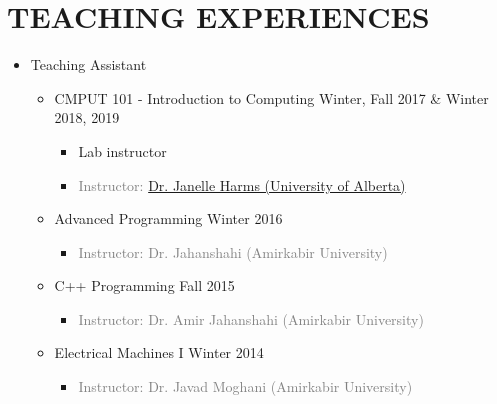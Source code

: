 \vspace{-2em}
\section{TEACHING EXPERIENCES}
\begin{itemize}
	\item Teaching Assistant
	\begin{itemize}
	
		\item {} CMPUT 101 - Introduction to Computing \hfill Winter, Fall 2017 \& Winter 2018, 2019
		\begin{itemize} 
			\item Lab instructor
			
			\item\textcolor{gray}{Instructor: \href{https://webdocs.cs.ualberta.ca/~harms/}{Dr. Janelle Harms (University of Alberta)}}
		\end{itemize}
			
		\item {} Advanced Programming \hfill Winter 2016
		\begin{itemize} 
			\item\textcolor{gray}{Instructor: Dr. Jahanshahi (Amirkabir University)}
		\end{itemize}
		
		\item {} C++ Programming \hfill Fall 2015
		\begin{itemize} 
			\item \textcolor{gray}{Instructor: Dr. Amir Jahanshahi (Amirkabir University)}
		\end{itemize}
		
		\item {} Electrical Machines I \hfill Winter 2014
		\begin{itemize} 
			\item \textcolor{gray}{Instructor: Dr. Javad Moghani (Amirkabir University)}
		\end{itemize}
		

\end{itemize}
\end{itemize}
